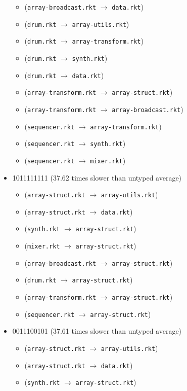 \documentclass{article}
\newcommand{\mono}[1]{\texttt{#1}}
\begin{document}
\begin{itemize}
\begin{itemize}
  \item (\mono{array-broadcast.rkt} $\rightarrow$ \mono{data.rkt})
  \item (\mono{drum.rkt} $\rightarrow$ \mono{array-utils.rkt})
  \item (\mono{drum.rkt} $\rightarrow$ \mono{array-transform.rkt})
  \item (\mono{drum.rkt} $\rightarrow$ \mono{synth.rkt})
  \item (\mono{drum.rkt} $\rightarrow$ \mono{data.rkt})
  \item (\mono{array-transform.rkt} $\rightarrow$ \mono{array-struct.rkt})
  \item (\mono{array-transform.rkt} $\rightarrow$ \mono{array-broadcast.rkt})
  \item (\mono{sequencer.rkt} $\rightarrow$ \mono{array-transform.rkt})
  \item (\mono{sequencer.rkt} $\rightarrow$ \mono{synth.rkt})
  \item (\mono{sequencer.rkt} $\rightarrow$ \mono{mixer.rkt})
  \end{itemize}
\item 1011111111 (37.62 times slower than untyped average)
  \begin{itemize}
  \item (\mono{array-struct.rkt} $\rightarrow$ \mono{array-utils.rkt})
  \item (\mono{array-struct.rkt} $\rightarrow$ \mono{data.rkt})
  \item (\mono{synth.rkt} $\rightarrow$ \mono{array-struct.rkt})
  \item (\mono{mixer.rkt} $\rightarrow$ \mono{array-struct.rkt})
  \item (\mono{array-broadcast.rkt} $\rightarrow$ \mono{array-struct.rkt})
  \item (\mono{drum.rkt} $\rightarrow$ \mono{array-struct.rkt})
  \item (\mono{array-transform.rkt} $\rightarrow$ \mono{array-struct.rkt})
  \item (\mono{sequencer.rkt} $\rightarrow$ \mono{array-struct.rkt})
  \end{itemize}
\item 0011100101 (37.61 times slower than untyped average)
  \begin{itemize}
  \item (\mono{array-struct.rkt} $\rightarrow$ \mono{array-utils.rkt})
  \item (\mono{array-struct.rkt} $\rightarrow$ \mono{data.rkt})
  \item (\mono{synth.rkt} $\rightarrow$ \mono{array-struct.rkt})

\end{itemize}
\end{itemize}
\end{document}
